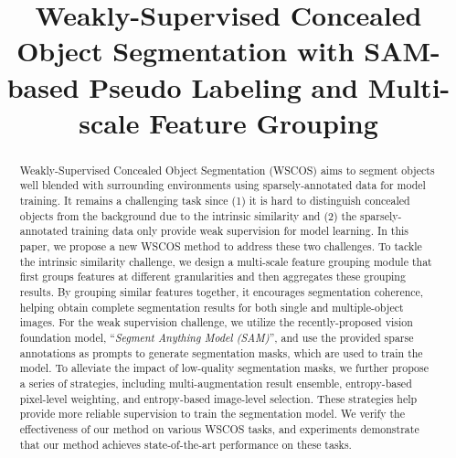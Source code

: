 \title{Weakly-Supervised Concealed Object Segmentation with SAM-based Pseudo Labeling and Multi-scale Feature Grouping}



\maketitle

\begin{abstract}
Weakly-Supervised Concealed Object Segmentation (WSCOS) aims to  segment objects well blended with surrounding environments using sparsely-annotated data for model training. It remains a challenging task since (1) it is hard to distinguish concealed objects from the background due to the intrinsic similarity and (2) the sparsely-annotated training data only provide weak supervision for model learning. In this paper, we propose a new WSCOS method to address these two challenges. To tackle the intrinsic similarity challenge, we design a multi-scale feature grouping module that first groups features at different granularities and then aggregates these grouping results. By grouping similar features together, it encourages segmentation coherence, helping obtain complete segmentation results for both single and multiple-object images. For the weak supervision challenge, we utilize the recently-proposed vision foundation model, ``\emph{Segment Anything Model (SAM)}'', and use the provided sparse annotations as prompts to generate segmentation masks, which are used to train the model. To alleviate the impact of low-quality segmentation masks, we further propose a series of strategies, including multi-augmentation result ensemble, entropy-based pixel-level weighting, and entropy-based image-level selection. These strategies help provide more reliable supervision to train the segmentation model. We verify the effectiveness of our method on various WSCOS tasks, and experiments demonstrate that our method achieves state-of-the-art performance on these tasks. 
\end{abstract}

\setlength{\abovedisplayskip}{2pt}
\setlength{\belowdisplayskip}{2pt}


